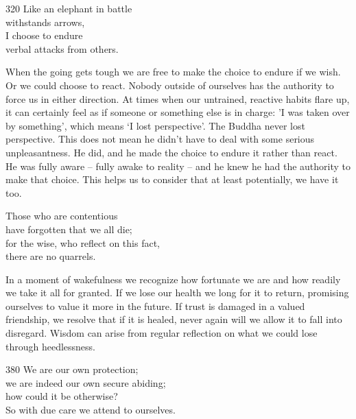 \begin{dhpVerse}{320}
\label{dhp-320}
Like an elephant in battle\\
withstands arrows,\\
I choose to endure\\
verbal attacks from others.
\end{dhpVerse}

\begin{dhpRefl}
When the going gets tough we are free to make the choice to endure if we wish. Or we could choose to react. Nobody outside of ourselves has the authority to force us in either direction. At times when our untrained, reactive habits flare up, it can certainly feel as if someone or something else is in charge: 'I was taken over by something', which means `I lost perspective'. The Buddha never lost perspective. This does not mean he didn't have to deal with some serious unpleasantness. He did, and he made the choice to endure it rather than react. He was fully aware – fully awake to reality – and he knew he had the authority to make that choice. This helps us to consider that at least potentially, we have it too.
\end{dhpRefl}


\begin{dhpVerse}{6}
\label{dhp-6}
Those who are contentious\\
have forgotten that we all die;\\
for the wise, who reflect on this fact,\\
there are no quarrels.
\end{dhpVerse}

\begin{dhpRefl}
In a moment of wakefulness we recognize how fortunate we are and how readily we take it all for granted. If we lose our health we long for it to return, promising ourselves to value it more in the future. If trust is damaged in a valued friendship, we resolve that if it is healed, never again will we allow it to fall into disregard. Wisdom can arise from regular reflection on what we could lose through heedlessness.
\end{dhpRefl}


\begin{dhpVerse}{380}
\label{dhp-380}
We are our own protection;\\
we are indeed our own secure abiding;\\
how could it be otherwise?\\
So with due care we attend to ourselves.
\end{dhpVerse}

